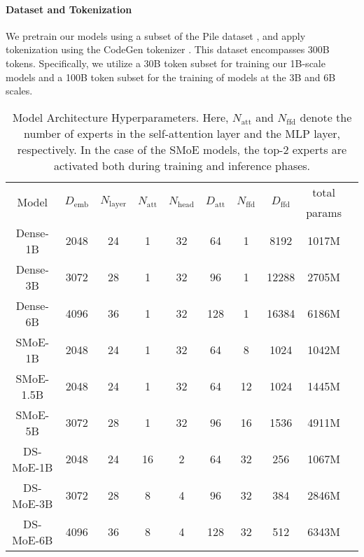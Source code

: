 \paragraph{Dataset and Tokenization}
We pretrain our models using a subset of the Pile dataset \cite{gao2020pile}, and apply tokenization using the CodeGen tokenizer \cite{nijkamp2022codegen}. This dataset encompasses 300B tokens. Specifically, we utilize a 30B token subset for training our 1B-scale models and a 100B token subset for the training of models at the 3B and 6B scales.

\begin{table*}[h]
    \centering
    \small
    \caption{Model Architecture Hyperparameters. Here, $N_\mathrm{att}$ and $N_\mathrm{ffd}$ denote the number of experts in the self-attention layer and the MLP layer, respectively. In the case of the SMoE models, the top-2 experts are activated both during training and inference phases.}
    \begin{tabular}{c|ccccccccc}
        \toprule
        \multirow{2}{*}{Model} & \multirow{2}{*}{$D_{\text{emb}}$} & \multirow{2}{*}{$N_\mathrm{layer}$} & \multirow{2}{*}{$N_\mathrm{att}$} & \multirow{2}{*}{$N_\mathrm{head}$} & \multirow{2}{*}{$D_\mathrm{att}$} & \multirow{2}{*}{$N_\mathrm{ffd}$} & \multirow{2}{*}{$D_\mathrm{ffd}$} & total \\
         & & & & & & & & params \\
        \midrule
        Dense-1B & 2048 & 24 & 1 & 32 & 64 & 1 & 8192 & 1017M  \\
        Dense-3B & 3072 & 28 & 1 & 32 & 96 & 1 & 12288 & 2705M \\
        Dense-6B & 4096 & 36 & 1 & 32 & 128 & 1 & 16384 & 6186M \\
        \midrule
        SMoE-1B & 2048 & 24 & 1 & 32 & 64 & 8 & 1024 & 1042M \\
        SMoE-1.5B & 2048 & 24 & 1 & 32 & 64 & 12 & 1024 & 1445M  \\
        SMoE-5B & 3072 & 28 & 1 & 32 & 96 & 16 & 1536 & 4911M \\
        \midrule
        DS-MoE-1B & 2048 & 24 & 16 & 2 & 64 & 32 & 256 & 1067M \\
        DS-MoE-3B & 3072 & 28 & 8 & 4 & 96 & 32 & 384 & 2846M \\
        DS-MoE-6B & 4096 & 36 & 8 & 4 & 128 & 32 & 512 & 6343M  \\
        \bottomrule
    \end{tabular}
    \label{tab:model_arch}
\end{table*}
